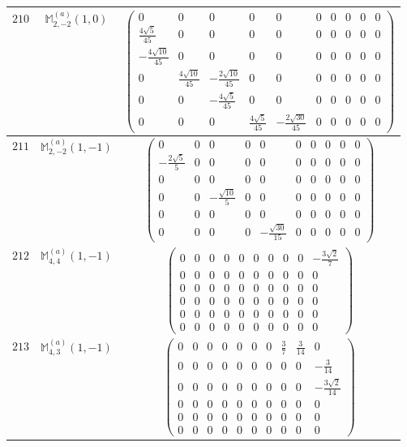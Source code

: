 \documentclass[fleqn,8pt,landscape]{jsarticle}
\begin{document}
\begin{center}
\begin{longtable}{ccc}
$ 210 $ & $ \mathbb{M}_{2,-2}^{(a)}(1,0) $ & $ \begin{pmatrix} 0 & 0 & 0 & 0 & 0 & 0 & 0 & 0 & 0 & 0 \\ \frac{4 \sqrt{5}}{45} & 0 & 0 & 0 & 0 & 0 & 0 & 0 & 0 & 0 \\ - \frac{4 \sqrt{10}}{45} & 0 & 0 & 0 & 0 & 0 & 0 & 0 & 0 & 0 \\ 0 & \frac{4 \sqrt{10}}{45} & - \frac{2 \sqrt{10}}{45} & 0 & 0 & 0 & 0 & 0 & 0 & 0 \\ 0 & 0 & - \frac{4 \sqrt{5}}{45} & 0 & 0 & 0 & 0 & 0 & 0 & 0 \\ 0 & 0 & 0 & \frac{4 \sqrt{5}}{45} & - \frac{2 \sqrt{30}}{45} & 0 & 0 & 0 & 0 & 0 \end{pmatrix} $ \\ \hline
$ 211 $ & $ \mathbb{M}_{2,-2}^{(a)}(1,-1) $ & $ \begin{pmatrix} 0 & 0 & 0 & 0 & 0 & 0 & 0 & 0 & 0 & 0 \\ - \frac{2 \sqrt{5}}{5} & 0 & 0 & 0 & 0 & 0 & 0 & 0 & 0 & 0 \\ 0 & 0 & 0 & 0 & 0 & 0 & 0 & 0 & 0 & 0 \\ 0 & 0 & - \frac{\sqrt{10}}{5} & 0 & 0 & 0 & 0 & 0 & 0 & 0 \\ 0 & 0 & 0 & 0 & 0 & 0 & 0 & 0 & 0 & 0 \\ 0 & 0 & 0 & 0 & - \frac{\sqrt{30}}{15} & 0 & 0 & 0 & 0 & 0 \end{pmatrix} $ \\ \hline
$ 212 $ & $ \mathbb{M}_{4,4}^{(a)}(1,-1) $ & $ \begin{pmatrix} 0 & 0 & 0 & 0 & 0 & 0 & 0 & 0 & 0 & - \frac{3 \sqrt{2}}{7} \\ 0 & 0 & 0 & 0 & 0 & 0 & 0 & 0 & 0 & 0 \\ 0 & 0 & 0 & 0 & 0 & 0 & 0 & 0 & 0 & 0 \\ 0 & 0 & 0 & 0 & 0 & 0 & 0 & 0 & 0 & 0 \\ 0 & 0 & 0 & 0 & 0 & 0 & 0 & 0 & 0 & 0 \\ 0 & 0 & 0 & 0 & 0 & 0 & 0 & 0 & 0 & 0 \end{pmatrix} $ \\ \hline
$ 213 $ & $ \mathbb{M}_{4,3}^{(a)}(1,-1) $ & $ \begin{pmatrix} 0 & 0 & 0 & 0 & 0 & 0 & 0 & \frac{3}{7} & \frac{3}{14} & 0 \\ 0 & 0 & 0 & 0 & 0 & 0 & 0 & 0 & 0 & - \frac{3}{14} \\ 0 & 0 & 0 & 0 & 0 & 0 & 0 & 0 & 0 & - \frac{3 \sqrt{2}}{14} \\ 0 & 0 & 0 & 0 & 0 & 0 & 0 & 0 & 0 & 0 \\ 0 & 0 & 0 & 0 & 0 & 0 & 0 & 0 & 0 & 0 \\ 0 & 0 & 0 & 0 & 0 & 0 & 0 & 0 & 0 & 0 \end{pmatrix} $ \\ \hline

\end{longtable}
\end{center}
\end{document}
